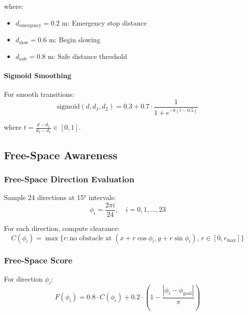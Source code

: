 where:
\begin{itemize}
    \item $d_{\text{emergency}} = 0.2$ m: Emergency stop distance
    \item $d_{\text{slow}} = 0.6$ m: Begin slowing
    \item $d_{\text{safe}} = 0.8$ m: Safe distance threshold
\end{itemize}

\paragraph{Sigmoid Smoothing}
For smooth transitions:
\begin{equation}
\text{sigmoid}(d, d_1, d_2) = 0.3 + 0.7 \cdot \frac{1}{1 + e^{-8(t - 0.5)}}
\label{eq:sigmoid_smooth}
\end{equation}

where $t = \frac{d - d_1}{d_2 - d_1} \in [0, 1]$.

\subsection{Free-Space Awareness}

\subsubsection{Free-Space Direction Evaluation}

Sample 24 directions at 15° intervals:
\begin{equation}
\phi_i = \frac{2\pi i}{24}, \quad i = 0, 1, \ldots, 23
\label{eq:direction_samples}
\end{equation}

For each direction, compute clearance:
\begin{equation}
C(\phi_i) = \max\{r : \text{no obstacle at } (x + r\cos\phi_i, y + r\sin\phi_i), \, r \in [0, r_{\max}]\}
\label{eq:clearance_direction}
\end{equation}

\subsubsection{Free-Space Score}

For direction $\phi_i$:
\begin{equation}
F(\phi_i) = 0.8 \cdot C(\phi_i) + 0.2 \cdot \left(1 - \frac{|\phi_i - \phi_{\text{goal}}|}{\pi}\right)
\label{eq:free_space_direction_score}
\end{equation}


